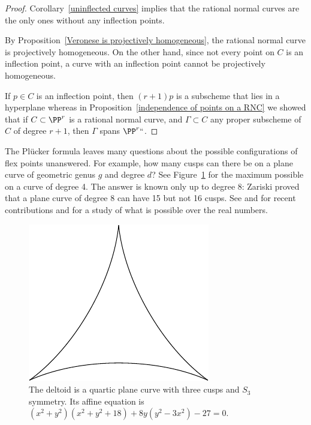 \begin{proof}
Corollary~\ref{uninflected curves} implies that the
rational normal curves are the only ones without any inflection points.

By Proposition~\ref{Veronese is projectively homogeneous}, the rational
normal curve
is projectively homogeneous. On the other hand, since not every point
on $C$ is an inflection point, a curve with an inflection point cannot
be projectively homogeneous.

If $p \in C$ is an inflection point, then $(r+1)p$ is  a subscheme that
lies in a hyperplane
whereas in Proposition~\ref{independence of points on a RNC} we showed
that if $C \subset \PP^r$ is a rational normal curve, and $\Gamma
\subset C$ any proper subscheme of $C$ of degree $r+1$, then $\Gamma$
spans $\PP^r` `$.
\end{proof}

The Pl\"ucker formula leaves many questions about the possible
configurations of flex points unanswered.
For example, how many cusps can there be on a plane curve of geometric
genus $g$ and degree $d$? See
Figure~\ref{3 real cusps} for the maximum possible on a curve of degree 4.
The answer is known only up to degree 8: 
Zariski
%
%
%
%
%
%
\citeyear{Zariski1931} 
proved
that
a plane curve of degree 8 can have 15 but not 16 cusps.
See \cite{Calabri} and \cite{Kulikov} for recent contributions and
\cite{Kharlamov-Sottile} for a study of what is possible
over the real numbers.

\begin{figure}\label{3-cusp quartic}
\includegraphics[scale=.7]{"main/deltoid"}
\caption{The deltoid is a quartic plane curve with three cusps and
  $S_3$ symmetry. Its
affine equation is $(x^2+y^2)(x^2+y^2+18)+8y(y^2-3x^2)-27=0$.
}
 \label{3 real cusps}
\end{figure}

